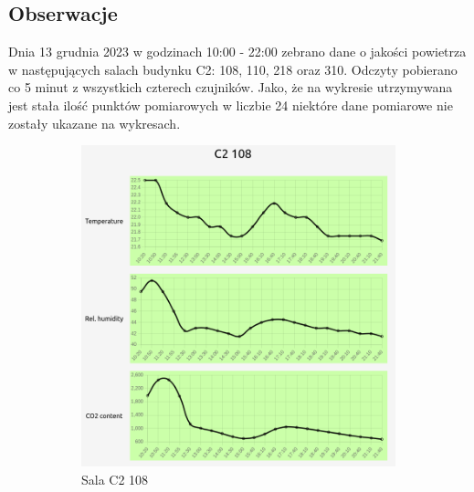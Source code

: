 \subsection{Obserwacje}

Dnia 13 grudnia 2023 w godzinach 10:00 - 22:00 zebrano dane o jakości powietrza w następujących salach budynku C2: 108, 110, 218 oraz 310. Odczyty pobierano
co 5 minut z wszystkich czterech czujników. Jako, że na wykresie utrzymywana jest stała ilość punktów pomiarowych w liczbie 24 niektóre dane pomiarowe 
nie zostały ukazane na wykresach.

\begin{figure}[H]
    \begin{subfigure}{0.5\textwidth}
        \centering
        \includegraphics[width=\linewidth]{zdj/app/readings-c2108.png}
        \caption{Sala C2 108}
    \end{subfigure}
    \begin{subfigure}{0.5\textwidth}
        \centering

\end{subfigure}
\end{figure}
